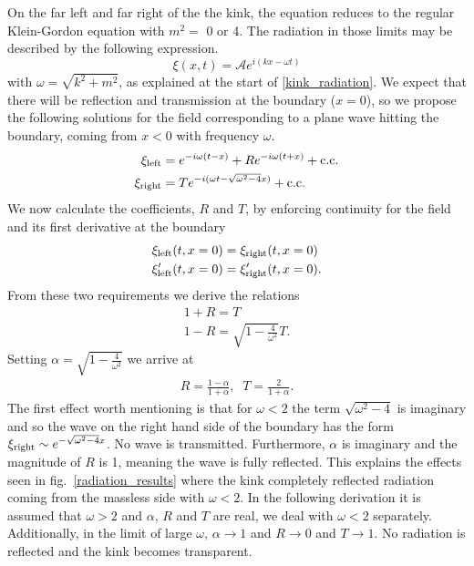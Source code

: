 \documentclass[11pt, oneside,titlepage]{article}  	%
\numberwithin{equation}{section}
\begin{document}
On the far left and far right of the the kink, the equation reduces to the regular Klein-Gordon equation with $m^2 = $ 0 or 4. The radiation in those limits may be described by the following expression.
\begin{equation}
\xi(x,t) = \mathcal{A}e^{i(kx-\omega t)}
\end{equation}
with $\omega = \sqrt{k^2 + m^2}$, as explained at the start of \textsection \ref{kink_radiation}. We expect that there will be reflection and transmission at the boundary ($x=0$), so we propose the following solutions for the field corresponding to a plane wave hitting the boundary, coming from $x<0$ with frequency $\omega$.
\begin{align}
\xi_\textup{left} &= e^{-i\omega (t-x)} + Re^{-i\omega (t+x)} + \textup{c.c.} \label{wave_left}\\
\xi_\textup{right} &= T e^{-i(\omega t-\sqrt{\omega^2 - 4}x)} + \textup{c.c.} \label{wave_right}
\end{align}
We now calculate the coefficients, $R$ and $T$, by enforcing continuity for the field and its first derivative at the boundary
\begin{align}
\xi_\textup{left}(t,x=0) &= \xi_\textup{right}(t,x=0) \label{cont1}\\
\xi'_\textup{left}(t,x=0) &= \xi'_\textup{right}(t,x=0). \label{cont2}
\end{align}
From these two requirements we derive the relations
\begin{align}
1+R = T\\
1-R = \sqrt{1-\frac{4}{\omega^2}}T.
\end{align}
Setting $\alpha = \sqrt{1-\frac{4}{\omega^2}}$ we arrive at
\begin{align} \label{RT}
R = \frac{1-\alpha}{1+\alpha}, \;\; T = \frac{2}{1+\alpha}.
\end{align}
The first effect worth mentioning is that for $\omega < 2$ the term $\sqrt{\omega^2 - 4}$ is imaginary and so the wave on the right hand side of the boundary has the form $ \xi_\textup{right} \sim e^{-\sqrt{\omega^2 - 4}x}$. No wave is transmitted. Furthermore, $\alpha$ is imaginary and the magnitude of $R$ is 1, meaning the wave is fully reflected. This explains the effects seen in fig.~\ref{radiation_results} where the kink completely reflected radiation coming from the massless side with $\omega < 2$. In the following derivation it is assumed that $\omega> 2$ and $\alpha$, $R$ and $T$ are real, we deal with $\omega< 2$ separately. Additionally, in the limit of large $\omega$, $\alpha \rightarrow 1$ and $R\rightarrow0$ and $T \rightarrow 1$. No radiation is reflected and the kink becomes transparent.\par
\end{document}
